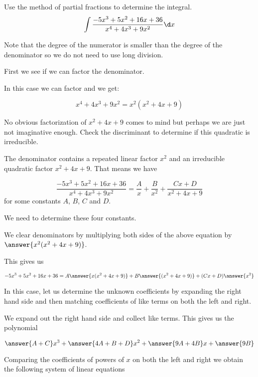 \documentclass{ximera}
\author{Jason Miller}
\begin{document}
\begin{exercise}
Use the method of partial fractions to determine the integral.
\[
\int \frac{-5x^{3}+5x^{2}+16x+36}{x^{4}+4x^{3}+9x^{2}} \d x
\]

Note that the degree of the numerator is smaller than the degree of the denominator so we do not need 
to use long division. 

First we see if we can factor the denominator. 

In this case we can factor and we get:

\[
x^{4}+4x^{3}+9x^{2}=x^{2}(x^{2}+4x+9)
\]

No obvious factorization of $x^{2}+4x+9$ comes to mind but perhaps we are just not imaginative enough. 
Check the discriminant to determine if this quadratic is irreducible. 


  \begin{multipleChoice}
  \end{multipleChoice}

\begin{exercise} 

The denominator contains a repeated linear factor $x^{2}$ and an irreducible quadratic factor $x^{2}+4x+9$. 
That means we have

\[
 \frac{-5x^{3}+5x^{2}+16x+36}{x^{4}+4x^{3}+9x^{2}}= \frac{A}{x} + \frac{B}{x^{2}} +\frac{Cx+D}{x^{2}+4x+9}
\]
for some constants $A$, $B$, $C$ and $D$.

We need to determine these four constants. 

We clear denominators by multiplying both sides of the above equation by $\answer{x^{2}(x^{2}+4x+9)}$. 

This gives us 

\[
-5x^{3}+5x^{2}+16x+36=A\answer{ x(x^{2}+4x+9)} + B\answer{ (x^{2}+4x+9)} +  (Cx+D)\answer{x^{2}}
\]

In this case, let us determine the unknown coefficients by expanding the right hand side and then matching coefficients of like terms on both the left and right. 

We expand out the right hand side and collect like terms. This gives us the polynomial

\[
\answer{A+C}x^{3}+\answer{4A+B+D}x^{2}+\answer{9A+4B}x+\answer{9B}
\]


\begin{exercise}

Comparing the coefficients of powers of $x$ on both the left and right we obtain the following system of linear equations


\end{exercise}
\end{exercise}
\end{exercise}
\end{document}
